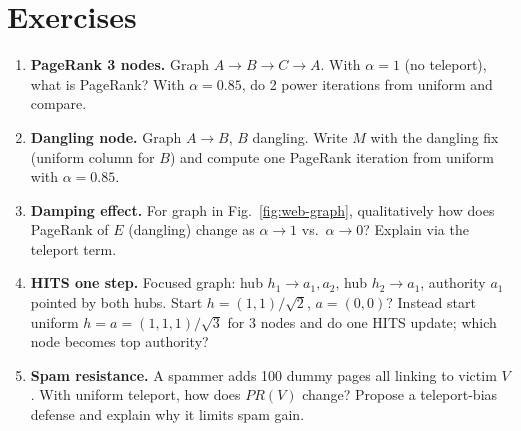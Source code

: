 \section{Exercises}
\begin{enumerate}[label=E7.\arabic*, leftmargin=*, itemsep=0.6em]
  \item \textbf{PageRank 3 nodes.} Graph $A\!\to\!B\!\to\!C\!\to\!A$. With $\alpha=1$ (no teleport), what is PageRank? With $\alpha=0.85$, do 2 power iterations from uniform and compare.
  \item \textbf{Dangling node.} Graph $A\!\to\!B$, $B$ dangling. Write $M$ with the dangling fix (uniform column for $B$) and compute one PageRank iteration from uniform with $\alpha=0.85$.
  \item \textbf{Damping effect.} For graph in Fig.~\ref{fig:web-graph}, qualitatively how does PageRank of $E$ (dangling) change as $\alpha\to1$ vs.\ $\alpha\to0$? Explain via the teleport term.
  \item \textbf{HITS one step.} Focused graph: hub $h_1\to a_1,a_2$, hub $h_2\to a_1$, authority $a_1$ pointed by both hubs. Start $h=(1,1)/\sqrt2$, $a=(0,0)$? Instead start uniform $h=a=(1,1,1)/\sqrt3$ for 3 nodes and do one HITS update; which node becomes top authority?
  \item \textbf{Spam resistance.} A spammer adds 100 dummy pages all linking to victim $V$. With uniform teleport, how does $PR(V)$ change? Propose a teleport-bias defense and explain why it limits spam gain.
\end{enumerate}

